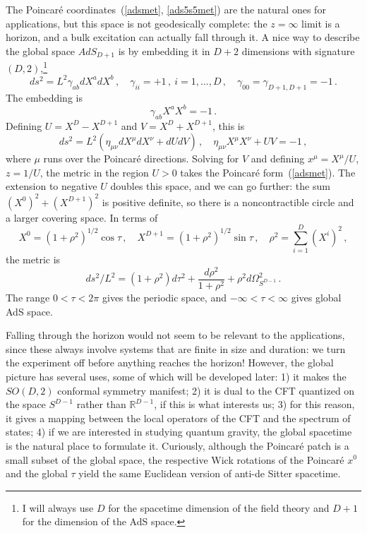 \documentclass[12pt]{article}
\begin{document}
{The Poincar\'e coordinates~(\ref{adsmet}, \ref{ads5s5met}) are the natural ones for applications, but this space is not geodesically complete: the $z = \infty$ limit is a horizon, and a bulk excitation can actually fall through it.  A nice way to describe the global space $AdS_{D+1}$ is by embedding it in $D+2$ dimensions with signature $(D,2)$,\footnote{I will always use $D$ for the spacetime dimension of the field theory and $D+1$ for the dimension of the AdS space.}
\begin{equation}
ds^2 =  L^2 \gamma_{ab} dX^a dX^b\,, \quad \gamma_{ii} = +1\,,\ i = 1, \ldots, D \,, \quad\gamma_{00} = \gamma_{D+1,D+1} = -1 \,.
\end{equation}
The embedding is
\begin{equation}
\gamma_{ab} X^a X^b = - 1 \,.
\end{equation}
Defining $U = X^D - X^{D+1}$ and $V = X^D + X^{D+1}$, this is
\begin{equation}
ds^2 = L^2(\eta_{\mu\nu} dX^\mu dX^\nu + dU dV) \,,  \quad \eta_{\mu\nu} X^\mu X^\nu + U V = -1 \,,
\end{equation}
where $\mu$ runs over the Poincar\'e directions.
Solving for $V$ and defining $x^\mu = X^\mu/U$, $z = 1/U$, the metric in the region $U > 0$ takes the Poincar\'e form~(\ref{adsmet}).  The extension to negative $U$ doubles this space, and we can go further: the sum $(X^0)^2 + (X^{D+1})^2$ is positive definite, so there is a noncontractible circle and a larger covering space.  In terms of
\begin{equation}
X^0 = (1 + \rho^2)^{1/2}  \cos \tau \,,\quad X^{D+1} = (1 + \rho^2)^{1/2}  \sin \tau \,,\quad
\rho^2 = \sum_{i=1}^D (X^i)^2 \,,
\end{equation}
the metric is
\begin{equation}
ds^2/L^2 = (1 + \rho^2) d\tau^2 + \frac{d\rho^2}{1 + \rho^2} + \rho^2 d\Omega^2_{S^{D-1}} \,.
\label{global}
\end{equation}
The range $0 < \tau < 2\pi$ gives the periodic space, and $-\infty < \tau < \infty$ gives global AdS space.  

Falling through the horizon would not seem to be relevant to the applications, since these always involve systems that are finite in size and duration: we turn the experiment off before anything reaches the horizon!  However, the global picture has several uses, some of which will be developed later: 1) it makes the $SO(D,2)$ conformal symmetry manifest; 2) it is dual to the CFT quantized on the space $S^{D-1}$ rather than $ {\mathbb R}^{D-1}$, if this is what interests us; 3) for this reason, it gives a mapping between the local operators of the CFT and the spectrum of states; 4) if we are interested in studying quantum gravity, the global spacetime is the natural place to formulate it.  Curiously, although the Poincar\'e patch is a small subset of the global space, the respective Wick rotations of the Poincar\'e $x^0$ and the global $\tau$ yield the same Euclidean version of anti-de Sitter spacetime.

}
\end{document}
